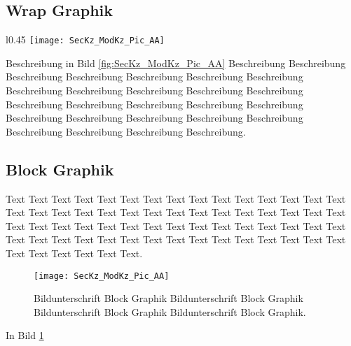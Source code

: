 \documentclass[a4paper, 12pt, xcolor=dvipsnames]{scrartcl}	%
\begin{document}
\subsection{Wrap Graphik}
%
\begin{wrapfigure}[10]{l}{0.45\textwidth} 
	\vspace{-0.5cm}
	\texttt{[image: SecKz\_ModKz\_Pic\_AA]}		
	\hspace{-0.0cm}\caption{Bildunterschrift Wrap Graphik Bildunterschrift Wrap Graphik Bildunterschrift Wrap Graphik Bildunterschrift Wrap Graphik .}
	\label{fig:SecKz_ModKz_Pic_AA}
\end{wrapfigure}
%
Beschreibung in Bild \ref{fig:SecKz_ModKz_Pic_AA} Beschreibung Beschreibung Beschreibung Beschreibung Beschreibung Beschreibung Beschreibung Beschreibung Beschreibung Beschreibung Beschreibung Beschreibung Beschreibung Beschreibung Beschreibung Beschreibung Beschreibung Beschreibung Beschreibung Beschreibung Beschreibung Beschreibung Beschreibung Beschreibung Beschreibung Beschreibung.
\vspace{2.9cm}

%
%
\subsection{Block Graphik}
Text Text Text Text Text Text Text Text Text Text Text Text Text Text Text Text Text Text Text Text Text Text Text Text Text Text Text Text Text Text Text Text Text Text Text Text Text Text Text Text Text Text Text Text Text Text Text Text Text Text Text Text Text Text Text Text Text Text Text Text Text Text Text Text Text Text.\\

%
\begin{figure}[h!] 
	\vspace{-0.5cm}
	\hspace{-0.0cm}\texttt{[image: SecKz\_ModKz\_Pic\_AA]}
      \caption{Bildunterschrift Block Graphik Bildunterschrift Block Graphik Bildunterschrift Block Graphik Bildunterschrift Block Graphik.}
	\label{fig:SecKz_ModKz_Pic_AAb}
\end{figure}
%
In Bild \ref{fig:SecKz_ModKz_Pic_AAb} \Blindtext \lipsum[1-2]	%
%
\pagebreak
\end{document}

